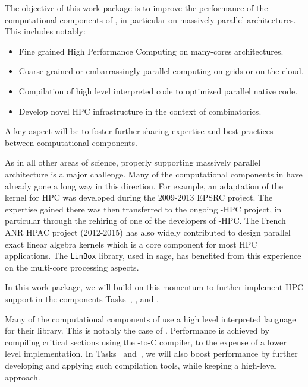 \begin{workpackage}[id=hpc,wphases=36-48,
  title=High Performance Computing,
  PSRM=1, %
  LLRM=12, %
  SARM=1, %
  UKRM=1, %
  UBRM=1, %
  UJFRM=12] %
  
\begin{wpobjectives}
  The objective of this work package is to improve the performance of
  the computational components of \TheProject, in particular on
  massively parallel architectures. This includes notably:
  \begin{itemize}
  \item Fine grained High Performance Computing on many-cores architectures.
  \item Coarse grained or embarrassingly parallel computing on grids or on the cloud.
  \item Compilation of high level interpreted code to optimized parallel native code.
  \item Develop novel HPC infrastructure in the context of combinatorics.
  \end{itemize}
  A key aspect will be to foster further sharing expertise and best
  practices between computational components.
\end{wpobjectives}

\begin{wpdescription}
  As in all other areas of science, properly supporting massively
  parallel architecture is a major challenge. Many of the
  computational components in \TheProject have already gone a long way
  in this direction. For example, an adaptation of the \GAP kernel for
  HPC was developed during the 2009-2013 EPSRC project. The expertise
  gained there was then transferred to the ongoing \Singular-HPC
  project, in particular through the rehiring of one of the developers
  of \GAP-HPC. The French ANR HPAC project (2012-2015) has also widely contributed to design
  parallel exact linear algebra kernels  which is a core component for most HPC
  applications. The \texttt{LinBox} library, used in sage, has benefited from this
  experience on the multi-core processing aspects. 

  In this work package, we will build on this momentum to further
  implement HPC support in the components Tasks~,
  , and .


  Many of the computational components of \TheProject use a high level
  interpreted language for their library. This is notably the case of
  \Sage. Performance is achieved by compiling critical sections using
  the \Cython \Python-to-C compiler, to the expense of a lower level
  implementation. In Tasks~
  and~, we will also boost performance by
  further developing and applying such compilation tools, while
  keeping a high-level approach.


\end{wpdescription}
\end{workpackage}
